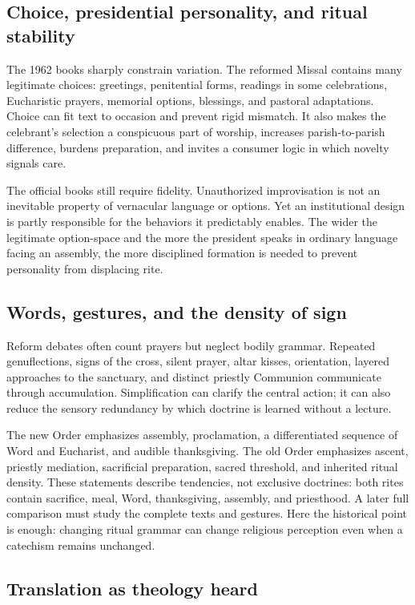 \subsection{Choice, presidential personality, and ritual stability}

The 1962 books sharply constrain variation. The reformed Missal contains many legitimate choices: greetings, penitential forms, readings in some celebrations, Eucharistic prayers, memorial options, blessings, and pastoral adaptations. Choice can fit text to occasion and prevent rigid mismatch. It also makes the celebrant's selection a conspicuous part of worship, increases parish-to-parish difference, burdens preparation, and invites a consumer logic in which novelty signals care.

The official books still require fidelity. Unauthorized improvisation is not an inevitable property of vernacular language or options. Yet an institutional design is partly responsible for the behaviors it predictably enables. The wider the legitimate option-space and the more the president speaks in ordinary language facing an assembly, the more disciplined formation is needed to prevent personality from displacing rite.

\subsection{Words, gestures, and the density of sign}

Reform debates often count prayers but neglect bodily grammar. Repeated genuflections, signs of the cross, silent prayer, altar kisses, orientation, layered approaches to the sanctuary, and distinct priestly Communion communicate through accumulation. Simplification can clarify the central action; it can also reduce the sensory redundancy by which doctrine is learned without a lecture.

The new Order emphasizes assembly, proclamation, a differentiated sequence of Word and Eucharist, and audible thanksgiving. The old Order emphasizes ascent, priestly mediation, sacrificial preparation, sacred threshold, and inherited ritual density. These statements describe tendencies, not exclusive doctrines: both rites contain sacrifice, meal, Word, thanksgiving, assembly, and priesthood. A later full comparison must study the complete texts and gestures. Here the historical point is enough: changing ritual grammar can change religious perception even when a catechism remains unchanged.

\subsection{Translation as theology heard}

